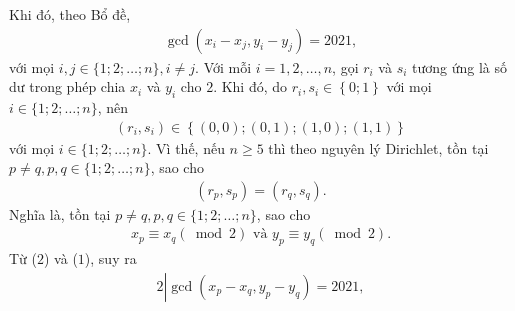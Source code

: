 \begin{multicols}{2}
	\vskip 0.05cm
	Khi đó, theo Bổ đề,
	\begin{align*}
		\gcd \left( {{x_i} - {x_j},{y_i} - {y_j}} \right) = 2021, \tag{$1$}
	\end{align*}
	với mọi $i, j \in \{1; 2; \ldots ; n\}, i \ne j$.
	\vskip 0.05cm
	Với mỗi $i = 1, 2, \ldots , n$, gọi $r_i$  và $s_i$  tương ứng là số dư trong phép chia $x_i$  và $y_i$  cho $2$.
	\vskip 0.05cm
	Khi đó, do  ${r_i},{s_i} \in \left\{ {0;1} \right\}$ với mọi $i \in \{1; 2; \ldots ; n\}$, nên
	\begin{align*}
		\left( {{r_i},{s_i}} \right) \in \left\{ {\left( {0,0} \right);\left( {0,1} \right);\left( {1,0} \right);\left( {1,1} \right)} \right\}
	\end{align*}
	với mọi $i \in \{1; 2; \ldots ; n\}$.
	\vskip 0.05cm
	Vì thế, nếu $n \ge  5$ thì theo nguyên lý Dirichlet, tồn tại $p \ne q, p, q \in \{1; 2; \ldots ; n\}$, sao cho
	\begin{align*}
		\left( {{r_p},{s_p}} \right) = \left( {{r_q},{s_q}} \right).
	\end{align*}
	Nghĩa là, tồn tại $p \ne q, p, q \in \{1; 2; \ldots ; n\}$, sao cho 
	\begin{align*}
		{x_p} \equiv {x_q}\left( {\bmod 2} \right) \text{ và } {y_p} \equiv {y_q}\left( {\bmod 2} \right). \tag{$2$}
	\end{align*}
	Từ ($2$) và ($1$), suy ra
	\begin{align*}
		2\left| {\gcd \left( {{x_p} - {x_q},{y_p} - {y_q}} \right) = 2021,} \right.
	\end{align*}

\end{multicols}
